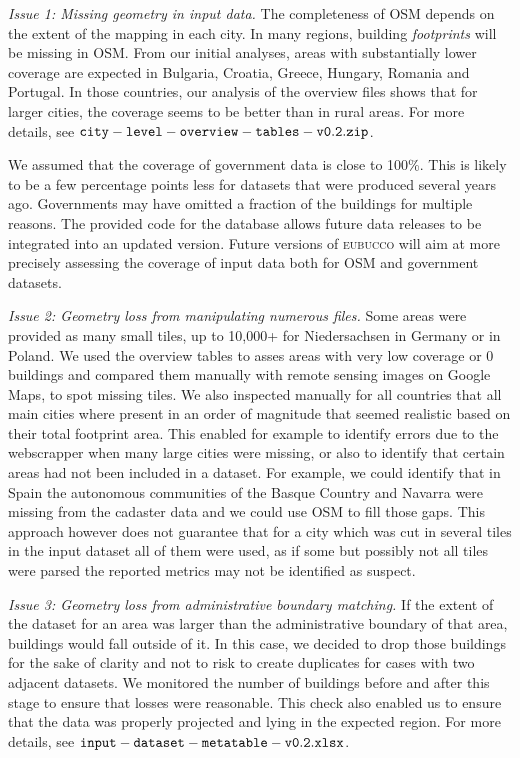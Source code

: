 \documentclass[fleqn,10pt]{wlscirep}
\begin{document}
\medskip  \noindent \textit{Issue 1: Missing geometry in input data.} \hspace{0.1cm} The completeness of OSM depends on the extent of the mapping in each city. In many regions, building \textit{footprints} will be missing in OSM. From our initial analyses, areas with substantially lower coverage are expected in Bulgaria, Croatia, Greece, Hungary, Romania and Portugal. In those countries, our analysis of the overview files shows that for larger cities, the coverage seems to be better than in rural areas. For more details, see ${\tt city-level-overview-tables-v0.2.zip}$. 

We assumed that the coverage of government data is close to 100\%. This is likely to be a few percentage points less for datasets that were produced several years ago. Governments may have omitted a fraction of the buildings for multiple reasons. The provided code for the database allows future data releases to be integrated into an updated version.
Future versions of \textsc{eubucco} will aim at more precisely assessing the coverage of input data both for OSM and government datasets.

\medskip \noindent \textit{Issue 2: Geometry loss from manipulating numerous files.} \hspace{0.1cm} Some areas were provided as many small tiles, up to 10,000+ for Niedersachsen in Germany or in Poland. We used the overview tables to asses areas with very low coverage or 0 buildings and compared them manually with remote sensing images on Google Maps, to spot missing tiles. We also inspected manually for all countries that all main cities where present in an order of magnitude that seemed realistic based on their total footprint area. This enabled for example to identify errors due to the webscrapper when many large cities were missing, or also to identify that certain areas had not been included in a dataset. For example, we could identify that in Spain the autonomous communities of the Basque Country and Navarra were missing from the cadaster data and we could use OSM to fill those gaps.  This approach however does not guarantee that for a city which was cut in several tiles in the input dataset all of them were used, as if some but possibly not all tiles were parsed the reported metrics may not be identified as suspect. 

\medskip \noindent \textit{Issue 3: Geometry loss from administrative boundary matching.} \hspace{0.1cm} If the extent of the dataset for an area was larger than the administrative boundary of that area, buildings would fall outside of it. In this case, we decided to drop those buildings for the sake of clarity and not to risk to create duplicates for cases with two adjacent datasets. We monitored the number of buildings before and after this stage to ensure that losses were reasonable. This check also enabled us to ensure that the data was properly projected and lying in the expected region. For more details, see ${\tt input-dataset-metatable-v0.2.xlsx}$.  
\end{document}

